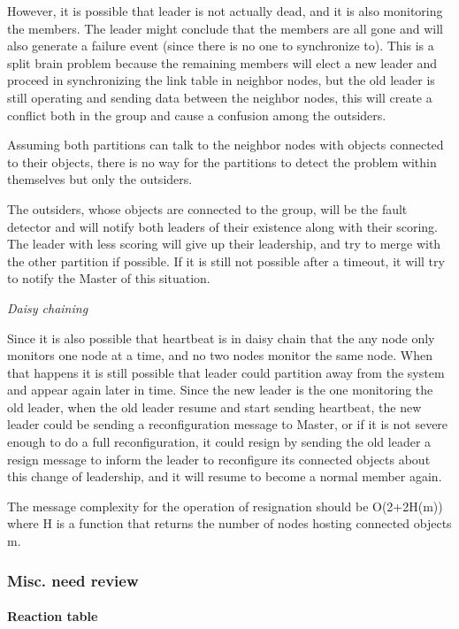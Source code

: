 However, it is possible that leader is not actually dead, and it is also monitoring the members. The leader might conclude that the members are all gone and will also generate a failure event (since there is no one to synchronize to). This is a split brain problem because the remaining members will elect a new leader and proceed in synchronizing the link table in neighbor nodes, but the old leader is still operating and sending data between the neighbor nodes, this will create a conflict both in the group and cause a confusion among the outsiders.

Assuming both partitions can talk to the neighbor nodes with objects connected to their objects, there is no way for the partitions to detect the problem within themselves but only the outsiders.

The outsiders, whose objects are connected to the group, will be the fault detector and will notify both leaders of their existence along with their scoring. The leader with less scoring will give up their leadership, and try to merge with the other partition if possible. If it is still not possible after a timeout, it will try to notify the Master of this situation.

\emph{Daisy chaining}

Since it is also possible that heartbeat is in daisy chain that the any node only monitors one node at a time, and no two nodes monitor the same node. When that happens it is still possible that leader could partition away from the system and appear again later in time. Since the new leader is the one monitoring the old leader, when the old leader resume and start sending heartbeat, the new leader could be sending a reconfiguration message to Master, or if it is not severe enough to do a full reconfiguration, it could resign by sending the old leader a resign message to inform the leader to reconfigure its connected objects about this change of leadership, and it will resume to become a normal member again.

The message complexity for the operation of resignation should be O(2+2H(m)) where H is a function that returns the number of nodes hosting connected objects m.



\subsubsection{Misc. need review}

\paragraph{Reaction table}

